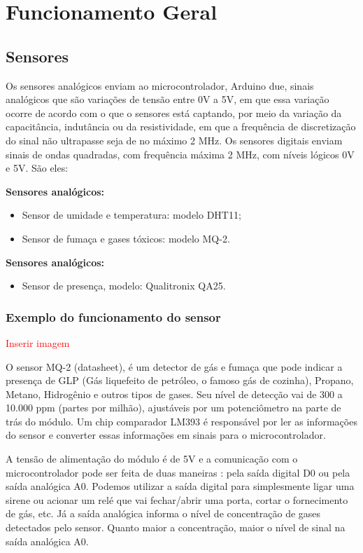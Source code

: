 \chapter{Funcionamento Geral}

\section{Sensores}
\par Os sensores analógicos enviam ao microcontrolador, Arduino due, sinais analógicos que são variações de tensão entre 0V a 5V, em que essa variação ocorre de acordo com o que o sensores está captando, por meio da variação da capacitância, indutância ou da resistividade, em que a frequência de discretização do sinal não ultrapasse  seja de no máximo 2 MHz. Os sensores digitais enviam sinais de ondas quadradas, com frequência máxima 2 MHz, com níveis lógicos 0V e 5V. São eles:
\par \textbf{Sensores analógicos:}
    \begin{itemize}
        \item Sensor de umidade e temperatura: modelo DHT11;
        \item Sensor de fumaça e gases tóxicos: modelo MQ-2.
    \end{itemize}
\par \textbf{Sensores analógicos:}
    \begin{itemize}
        \item Sensor de presença, modelo: Qualitronix QA25.
    \end{itemize}

\subsection{Exemplo do funcionamento do sensor}

\textcolor{red}{Inserir imagem}

\par O sensor MQ-2 (datasheet), é um detector de gás e fumaça que pode indicar a presença de GLP (Gás liquefeito de petróleo, o famoso gás de cozinha), Propano, Metano, Hidrogênio e outros tipos de gases. Seu nível de detecção vai de 300 a 10.000 ppm (partes por milhão), ajustáveis por um potenciômetro na parte de trás do módulo. Um chip comparador LM393 é responsável por ler as informações do sensor e converter essas informações em sinais para o microcontrolador.
\par A tensão de alimentação do módulo é de 5V e a comunicação com o microcontrolador pode ser feita de duas maneiras : pela saída digital D0 ou pela saída analógica A0. Podemos utilizar a saída digital para simplesmente ligar uma sirene ou acionar um relé que vai fechar/abrir uma porta, cortar o fornecimento de gás, etc. Já a saída analógica informa o nível de concentração de gases detectados pelo sensor. Quanto maior a concentração, maior o nível de sinal na saída analógica A0.

